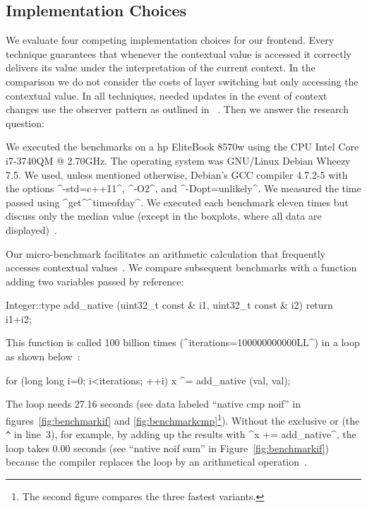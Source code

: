 \subsection{Implementation Choices}
\label{sec:frontend-implementation-choices}

We evaluate four competing implementation choices for our frontend.
Every technique guarantees that whenever the contextual value is accessed it correctly delivers its value under the interpretation of the current context.
In the comparison we do not consider the costs of layer switching but only accessing the contextual value.
In all techniques, needed updates in the event of context changes use the observer pattern as outlined in ~\cite{raab2014program}.
Then we answer the research question:
\rqFrontendTradeOff*


\label{sec:benchmark-setup}
We executed the benchmarks on a hp\textsuperscript{\textregistered} EliteBook 8570w using the CPU Intel\textsuperscript{\textregistered} Core\textsuperscript{\texttrademark} i7-3740QM @ 2.70GHz.
The operating system was GNU/Linux Debian Wheezy 7.5.
We used, unless mentioned otherwise, Debian's GCC compiler \mbox{4.7.2-5} with the options ^-std=c++11^, ^-O2^, and ^-Dopt=unlikely^.
We measured the time passed using ^get^\allowbreak^timeofday^.
We executed each benchmark eleven times but discuss only the median value (except in the boxplots, where all data are displayed)~\cite{raab2014program}.

Our micro-benchmark facilitates an arithmetic calculation that frequently accesses contextual values~\cite{raab2014program}.
We compare subsequent benchmarks with a function adding two variables passed by reference:

\begin{code}[language=Cpp]
Integer::type add_native (uint32_t const & i1,
				          uint32_t const & i2)
{
	return i1+i2;
}
\end{code}

This function is called 100 billion times (^iterations=100000000000LL^) in a loop as shown below~\cite{raab2014program}:

\begin{code}[language=Cpp]
for (long long i=0; i<iterations; ++i)
{
	x ^= add_native (val, val);
}
\end{code}

The loop needs 27.16 seconds (see data labeled ``native cmp noif'' in figures~\ref{fig:benchmarkif} and \ref{fig:benchmarkcmp}\footnote{The second figure compares the three fastest variants.}).
Without the exclusive or (the \lstinline{^} in line~3), for example, by adding up the results with ^x += add_native^, the loop takes 0.00 seconds (see ``native noif sum'' in Figure~\ref{fig:benchmarkif}) because the compiler replaces the loop by an arithmetical operation~\cite{raab2014program}.

